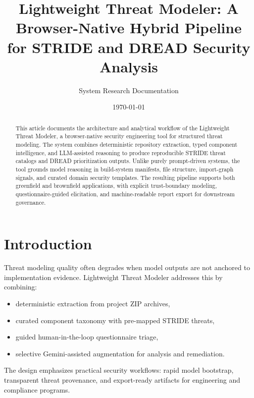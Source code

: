 \documentclass[12pt,a4paper]{article}
\title{Lightweight Threat Modeler: A Browser-Native Hybrid Pipeline for STRIDE and DREAD Security Analysis}
\author{System Research Documentation}
\date{\today}
\begin{document}
\maketitle
\onehalfspacing

\begin{abstract}
This article documents the architecture and analytical workflow of the Lightweight Threat Modeler, a browser-native security engineering tool for structured threat modeling. The system combines deterministic repository extraction, typed component intelligence, and LLM-assisted reasoning to produce reproducible STRIDE threat catalogs and DREAD prioritization outputs. Unlike purely prompt-driven systems, the tool grounds model reasoning in build-system manifests, file structure, import-graph signals, and curated domain security templates. The resulting pipeline supports both greenfield and brownfield applications, with explicit trust-boundary modeling, questionnaire-guided elicitation, and machine-readable report export for downstream governance.
\end{abstract}

\section{Introduction}
Threat modeling quality often degrades when model outputs are not anchored to implementation evidence. Lightweight Threat Modeler addresses this by combining:
\begin{itemize}
    \item deterministic extraction from project ZIP archives,
    \item curated component taxonomy with pre-mapped STRIDE threats,
    \item guided human-in-the-loop questionnaire triage,
    \item selective Gemini-assisted augmentation for analysis and remediation.
\end{itemize}

The design emphasizes practical security workflows: rapid model bootstrap, transparent threat provenance, and export-ready artifacts for engineering and compliance programs.
\end{document}
